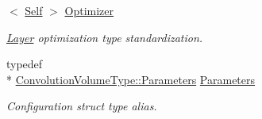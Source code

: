 \begin{DoxyCompactItemize}
$<$ \hyperlink{classffnn_1_1layer_1_1_convolution_a5eb9cca724b3a80a83f9edb685e3178e}{Self} $>$ \hyperlink{classffnn_1_1layer_1_1_convolution_abc5463dd8445a40bdc93716493a87a21}{Optimizer}
\begin{DoxyCompactList}\small\item\em \hyperlink{classffnn_1_1layer_1_1_layer}{Layer} optimization type standardization. \end{DoxyCompactList}\item 
typedef \\*
\hyperlink{structffnn_1_1layer_1_1_convolution_volume_1_1_parameters}{Convolution\-Volume\-Type\-::\-Parameters} \hyperlink{classffnn_1_1layer_1_1_convolution_af24f8cf9f456c36863d6e2d90592a057}{Parameters}
\begin{DoxyCompactList}\small\item\em Configuration struct type alias. \end{DoxyCompactList}\end{DoxyCompactItemize}
